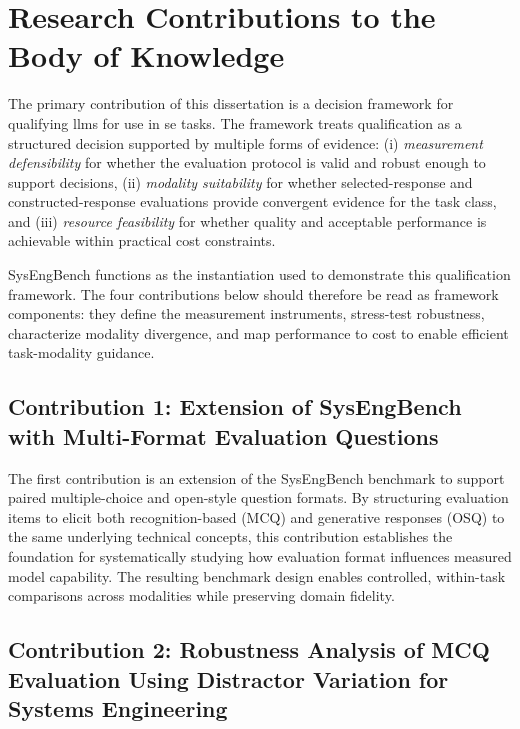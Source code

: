 \section{Research Contributions to the Body of Knowledge}\label{sec:research_contributions}

The primary contribution of this dissertation is a decision framework for qualifying \acp{llm} for use in \ac{se} tasks. The framework treats qualification as a structured decision supported by multiple forms of evidence: (i) \emph{measurement defensibility} for whether the evaluation protocol is valid and robust enough to support decisions, (ii) \emph{modality suitability} for whether selected-response and constructed-response evaluations provide convergent evidence for the task class, and (iii) \emph{resource feasibility} for whether quality and acceptable performance is achievable within practical cost constraints.

SysEngBench functions as the instantiation used to demonstrate this qualification framework. The four contributions below should therefore be read as framework components: they define the measurement instruments, stress-test robustness, characterize modality divergence, and map performance to cost to enable efficient task-modality guidance.

\subsection{Contribution 1: Extension of SysEngBench with Multi-Format Evaluation Questions}\label{subsec:Contribution_one}

The first contribution is an extension of the SysEngBench benchmark to support paired multiple-choice and open-style question formats. By structuring evaluation items to elicit both recognition-based (MCQ) and generative responses (OSQ) to the same underlying technical concepts, this contribution establishes the foundation for systematically studying how evaluation format influences measured model capability. The resulting benchmark design enables controlled, within-task comparisons across modalities while preserving domain fidelity. 


\subsection{Contribution 2: Robustness Analysis of MCQ Evaluation Using Distractor Variation for Systems Engineering}\label{subsec:Contribution_two}

